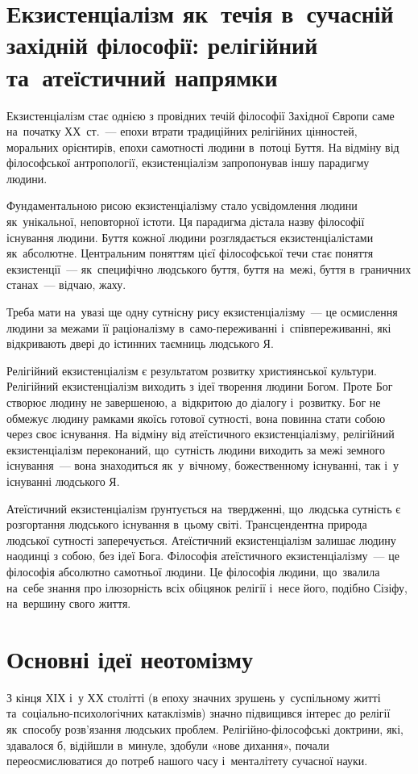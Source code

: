 \documentclass[a5paper,oneside,DIV=12,12pt,headings=small]{scrartcl}
\begin{document}
	\section{Екзистенціалізм як~течія в~сучасній західній філософії: релігійний та~атеїстичний напрямки}
		Екзистенціалізм стає однією з провідних течій філософії Західної Європи саме на~початку ХХ~ст.~— епохи втрати традиційних релігійних цінностей, моральних орієнтирів, епохи самотності людини в~потоці Буття. На відміну від філософської антропології, екзистенціалізм запропонував іншу парадигму людини.  
		
		Фундаментальною рисою екзистенціалізму стало усвідомлення людини як~унікальної, неповторної істоти. Ця парадигма дістала назву  філософії існування людини. Буття кожної людини розглядається екзистенціалістами як~абсолютне. Центральним поняттям цієї філософської течи стає поняття екзистенції~— як~специфічно людського  буття, буття на~межі, буття в~граничних станах~— відчаю, жаху.
		
		Треба мати на~увазі ще одну сутнісну рису екзистенціалізму~— це осмислення людини за межами її раціоналізму в~само-переживанні і~співпереживанні, які відкривають двері до істинних таємниць людського Я.
		
		Релігійний екзистенціалізм є результатом розвитку християнської культури. Релігійний екзистенціалізм виходить з ідеї творення людини Богом. Проте Бог створює людину не завершеною, а~відкритою до діалогу і~розвитку. Бог не обмежує людину рамками якоїсь готової сутності, вона повинна стати собою через своє існування. На відміну від атеїстичного екзистенціалізму, релігійний екзистенціалізм переконаний, що~сутність людини виходить за межі земного існування~— вона знаходиться як~у~вічному, божественному існуванні, так і~у існуванні людського Я.
		
		Атеїстичний екзистенціалізм ґрунтується на~твердженні, що~людська сутність є розгортання людського існування в~цьому світі. Трансцендентна природа людської сутності заперечується. Атеїстичний екзистенціалізм залишає людину наодинці з собою, без ідеї Бога. Філософія атеїстичного екзистенціалізму~— це філософія абсолютно самотньої людини. Це філософія людини, що~звалила на~себе знання про ілюзорність всіх обіцянок релігії і~несе його, подібно Сізіфу, на~вершину свого життя.
		
	\section{Основні ідеї неотомізму}
		З кінця ХІХ і~у ХХ столітті (в епоху значних зрушень у~суспільному житті та~со\-ці\-аль\-но-пси\-хо\-ло\-гіч\-них катаклізмів) значно підвищився інтерес до релігії як~способу розв'язання людських проблем. Ре\-лі\-гій\-но-фі\-ло\-соф\-ські доктрини, які, здавалося б, відійшли в~минуле, здобули «нове дихання», почали переосмислюватися до потреб нашого часу і~менталітету сучасної науки.
		
\end{document}
